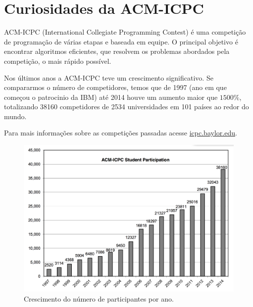 
\chapter{Curiosidades da ACM-ICPC} %

\label{AppendixA} %

ACM-ICPC (International Collegiate Programming Contest) é uma competição de programação
de várias etapas e baseada em equipe. O principal objetivo é encontrar algoritmos
eficientes, que resolvem os problemas abordados pela competição, o mais rápido
possível.


Nos últimos anos a ACM-ICPC teve um crescimento significativo. Se compararmos
o número de competidores, temos que de 1997 (ano em que começou o patrocinio
da IBM) até 2014 houve um aumento maior que $1500\%$, totalizando 38160
competidores de 2534 universidades em 101 países ao redor do mundo.

Para mais informa\c{c}\~oes sobre as competi\c{c}\~oes passadas acesse \href{icpc.baylor.edu}{icpc.baylor.edu}.

\begin{figure}[!htb]
    \centering
    \includegraphics[width=1\linewidth]{Figures/grafico.png}
    \caption{Crescimento do n\'umero de participantes por ano.}
\end{figure}

